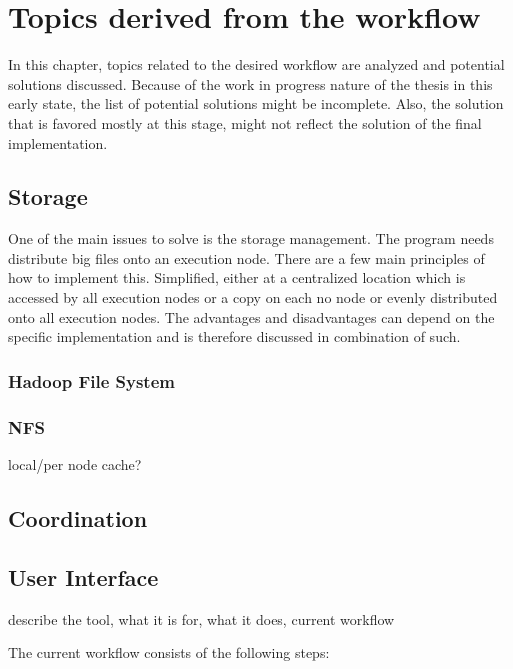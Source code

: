 \chapter{Topics derived from the workflow}

In this chapter, topics related to the desired workflow are analyzed and potential solutions discussed.
Because of the work in progress nature of the thesis in this early state, the list of potential solutions might be incomplete.
Also, the solution that is favored mostly at this stage, might not reflect the solution of the final implementation.

\section{Storage}

One of the main issues to solve is the storage management.
The program needs distribute big files onto an execution node.
There are a few main principles of how to implement this.
Simplified, either at a centralized location which is accessed by all execution nodes or a copy on each no node or evenly distributed onto all execution nodes.
The advantages and disadvantages can depend on the specific implementation and is therefore discussed in combination of such.

\subsection{Hadoop File System}

\subsection{NFS}

local/per node cache?

\section{Coordination}

\section{User Interface}




describe the tool, what it is for, what it does, current workflow

The current workflow consists of the following steps:


